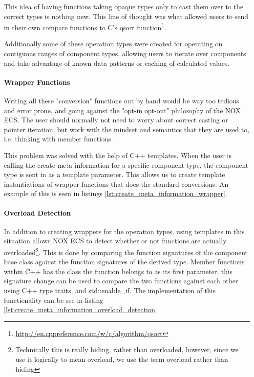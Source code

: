 This idea of having functions taking opaque types only to cast them over to the correct types is nothing new.
This line of thought was what allowed users to send in their own compare functions to C's qsort function\footnote{\url{http://en.cppreference.com/w/c/algorithm/qsort}}.

Additionally some of these operation types were created for operating on contiguous ranges of component types,
allowing users to iterate over components and take advantage of known data patterns or caching of calculated values.

\paragraph{Wrapper Functions}
Writing all these "conversion" functions out by hand would be way too tedious and error prone,
and going against the "opt-in opt-out" philosophy of the NOX ECS.
The user should normally not need to worry about correct casting or pointer iteration,
but work with the mindset and semantics that they are used to, i.e. thinking with member functions.

This problem was solved with the help of C++ templates.
When the user is calling the create meta information for a specific component type,
the component type is sent in as a template parameter.
This allows us to create template instantiations of wrapper functions that does the standard conversions.
An example of this is seen in listings \ref{lst:create_meta_information_wrapper}.


\paragraph{Overload Detection}
In addition to creating wrappers for the operation types, using templates in this situation
allows NOX ECS to detect whether or not functions are actually overloaded\footnote{Technically this is really hiding, rather than overloaded, however, since we use it logically to mean overload, we use the term overload rather than hiding}.
This is done by comparing the function signatures of the component base class against the function signatures of the derived type.
Member functions within C++ has the class the function belongs to as its first parameter\cite{iso_cpp_member_function_pointers},
this signature change can be used to compare the two functions against each other using C++ type traits, and std::enable\_if.
The implementation of this functionality can be see in listing \ref{lst:create_meta_information_overload_detection}

